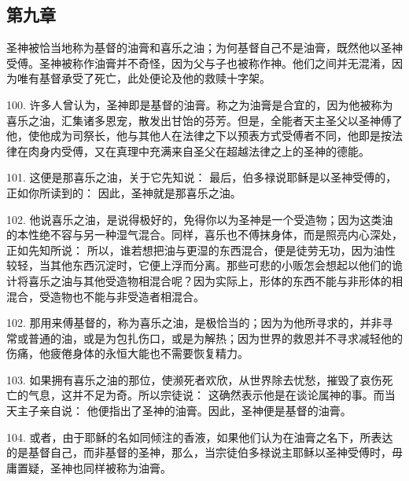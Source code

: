 
\subsection{第九章}

圣神被恰当地称为基督的油膏和喜乐之油；为何基督自己不是油膏，既然他以圣神受傅。圣神被称作油膏并不奇怪，因为父与子也被称作神。他们之间并无混淆，因为唯有基督承受了死亡，此处便论及他的救赎十字架。\par

100. 许多人曾认为，圣神即是基督的油膏。称之为油膏是合宜的，因为他被称为喜乐之油，汇集诸多恩宠，散发出甘饴的芬芳。但是，全能者天主圣父以圣神傅了他，使他成为司祭长，他与其他人在法律之下以预表方式受傅者不同，他即是按法律在肉身内受傅，又在真理中充满来自圣父在超越法律之上的圣神的德能。\par

101. 这便是那喜乐之油，关于它先知说： 最后，伯多禄说耶稣是以圣神受傅的，正如你所读到的： 因此，圣神就是那喜乐之油。\par

102. 他说喜乐之油，是说得极好的，免得你以为圣神是一个受造物；因为这类油的本性绝不容与另一种湿气混合。同样，喜乐也不傅抹身体，而是照亮内心深处，正如先知所说： 所以，谁若想把油与更湿的东西混合，便是徒劳无功，因为油性较轻，当其他东西沉淀时，它便上浮而分离。那些可悲的小贩怎会想起以他们的诡计将喜乐之油与其他受造物相混合呢？因为实际上，形体的东西不能与非形体的相混合，受造物也不能与非受造者相混合。\par

102. 那用来傅基督的，称为喜乐之油，是极恰当的；因为为他所寻求的，并非寻常或普通的油，或是为包扎伤口，或是为解热；因为世界的救恩并不寻求减轻他的伤痛，他疲倦身体的永恒大能也不需要恢复精力。\par

103. 如果拥有喜乐之油的那位，使濒死者欢欣，从世界除去忧愁，摧毁了哀伤死亡的气息，这并不足为奇。所以宗徒说： 这确然表示他是在谈论属神的事。而当天主子亲自说： 他便指出了圣神的油膏。因此，圣神便是基督的油膏。\par

104. 或者，由于耶稣的名如同倾注的香液，如果他们认为在油膏之名下，所表达的是基督自己，而非基督的圣神，那么，当宗徒伯多禄说主耶稣以圣神受傅时，毋庸置疑，圣神也同样被称为油膏。\par

